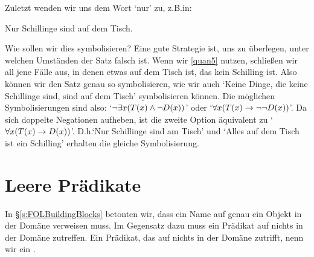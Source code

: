 
Zuletzt wenden wir uns dem Wort `nur' zu, z.B.\@ in:
\begin{earg}
	\item[\ex{quan5}] Nur Schillinge sind auf dem Tisch.
\end{earg}
Wie sollen wir dies symbolisieren? Eine gute Strategie ist, uns zu überlegen, unter welchen Umständen der Satz falsch ist. Wenn wir \ref{quan5} nutzen, schlie{\ss}en wir all jene Fälle aus, in denen etwas auf dem Tisch ist, das kein Schilling ist. Also können wir den Satz genau so symbolisieren, wie wir auch `Keine Dinge, die keine Schillinge sind, sind auf dem Tisch' symbolisieren können. Die möglichen Symbolisierungen sind also: `$\neg\exists x(\mathord{T}(x) \wedge \neg \mathord{D}(x))$' oder `$\forall x(\mathord{T}(x) \rightarrow \neg\neg \mathord{D}(x))$'. Da sich doppelte Negationen aufheben, ist die zweite Option äquivalent zu `$\forall x(\mathord{T}(x) \rightarrow \mathord{D}(x))$'. D.h.\@ `Nur Schillinge sind am Tisch' und `Alles auf dem Tisch ist ein Schilling' erhalten die gleiche Symbolisierung.


\section{Leere Prädikate}

In \S\ref{s:FOLBuildingBlocks} betonten wir, dass ein Name auf genau ein Objekt in der Domäne verweisen muss. Im Gegensatz dazu muss ein Prädikat auf nichts in der Domäne zutreffen. Ein Prädikat, das auf nichts in der Domäne zutrifft, nenn wir ein .


